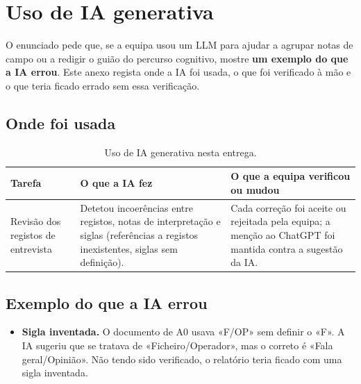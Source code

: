 \section{Uso de IA generativa}\label{anx:ia}

O enunciado pede que, se a equipa usou um LLM para ajudar a agrupar notas de campo ou a redigir o guião do percurso cognitivo, mostre \textbf{um exemplo do que a IA errou}. Este anexo regista onde a IA foi usada, o que foi verificado à mão e o que teria ficado errado sem essa verificação.

\subsection{Onde foi usada}

\begin{table}[H]
\centering\small
\begin{tabularx}{\textwidth}{@{}p{3.4cm}LL@{}}
\toprule
\textbf{Tarefa} & \textbf{O que a IA fez} & \textbf{O que a equipa verificou ou mudou} \\
\midrule
Revisão dos registos de entrevista & Detetou incoerências entre registos, notas de interpretação e siglas (referências a registos inexistentes, siglas sem definição). & Cada correção foi aceite ou rejeitada pela equipa; a menção ao ChatGPT foi mantida contra a sugestão da IA. \\
\bottomrule
\end{tabularx}
\caption{Uso de IA generativa nesta entrega.}
\label{tab:uso-ia}
\end{table}

\subsection{Exemplo do que a IA errou}

\begin{itemize}
  \item \textbf{Sigla inventada.} O documento de A0 usava «F/OP» sem definir o «F». A IA sugeriu que se tratava de «Ficheiro/Operador», mas o correto é «Fala geral/Opinião». 
  Não tendo sido verificado, o relatório teria ficado com uma sigla inventada.
\end{itemize}
